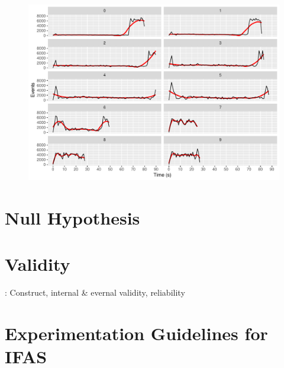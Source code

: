 \begin{figure}[htb]
        \includegraphics[width=\textwidth]{gfx/config-comparison_100k}
        \caption{}
        \label{fig:evaluation:performance:config-comparison_100k}
\end{figure}


\section{Null Hypothesis}





\section{Validity}
\label{sec:evaluation:validity}

\cite{Easterbrook2008a}: Construct, internal \& evernal validity, reliability

\section{Experimentation Guidelines for IFAS}


